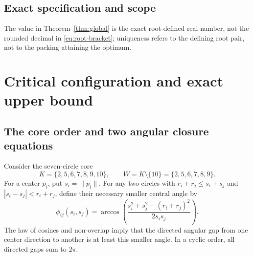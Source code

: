 \documentclass[11pt,a4paper]{article}
\theoremstyle{remark}
\newcommand{\norm}[1]{\lVert #1\rVert}
\begin{document}
\subsection{Exact specification and scope}

The value in Theorem~\ref{thm:global} is the exact root-defined real number,
not the rounded decimal in \eqref{eq:root-bracket}; uniqueness refers to the
defining root pair, not to the packing attaining the optimum.

\section{Critical configuration and exact upper bound}
\label{sec:critical}

\subsection{The core order and two angular closure equations}

Consider the seven-circle core
\[
  K=\{2,5,6,7,8,9,10\},\qquad
  W=K\setminus\{10\}=\{2,5,6,7,8,9\}.
\]
For a center $p_i$, put $s_i=\norm{p_i}$.  For any two circles with
$r_i+r_j\le s_i+s_j$ and $|s_i-s_j|<r_i+r_j$, define their necessary
smaller central angle by
\begin{equation}
  \phi_{ij}(s_i,s_j)=
  \arccos\!\left(
    \frac{s_i^2+s_j^2-(r_i+r_j)^2}{2s_is_j}
  \right).
  \label{eq:phi}
\end{equation}
The law of cosines and non-overlap imply that the directed angular gap from
one center direction to another is at least this smaller angle.  In a
cyclic order, all directed gaps sum to $2\pi$.
\end{document}
